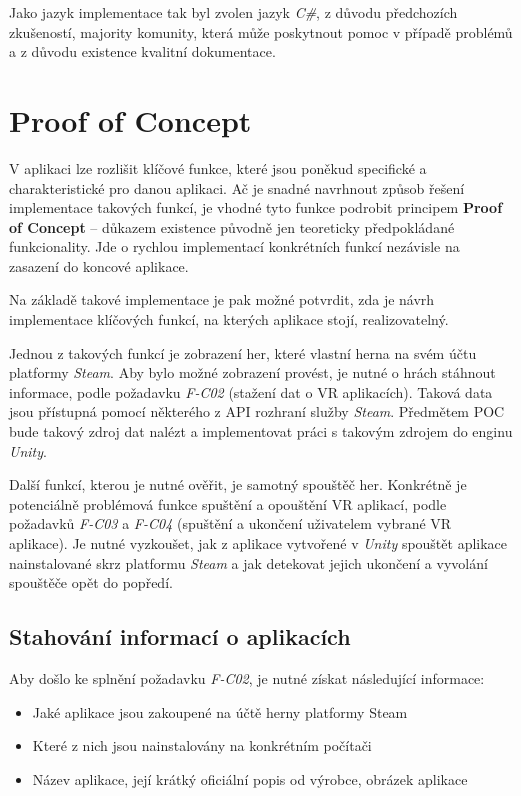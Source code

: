Jako jazyk implementace tak byl zvolen jazyk \emph{C\#}, z důvodu
předchozích zkušeností, majority komunity, která může poskytnout pomoc v
případě problémů a z důvodu existence kvalitní dokumentace.

\section{Proof of Concept}\label{proof-of-concept}

V aplikaci lze rozlišit klíčové funkce, které jsou poněkud specifické a
charakteristické pro danou aplikaci. Ač je snadné navrhnout způsob
řešení implementace takových funkcí, je vhodné tyto funkce podrobit
principem \textbf{Proof of Concept} -- důkazem existence původně jen
teoreticky předpokládané funkcionality. Jde o rychlou implementací
konkrétních funkcí nezávisle na zasazení do koncové aplikace.

Na základě takové implementace je pak možné potvrdit, zda je návrh
implementace klíčových funkcí, na kterých aplikace stojí,
realizovatelný.

Jednou z takových funkcí je zobrazení her, které vlastní herna na svém
účtu platformy \emph{Steam}. Aby bylo možné zobrazení provést, je nutné
o hrách stáhnout informace, podle požadavku \emph{F-C02} (stažení dat o
VR aplikacích). Taková data jsou přístupná pomocí některého z API
rozhraní služby \emph{Steam}. Předmětem POC bude takový zdroj dat nalézt
a implementovat práci s takovým zdrojem do enginu \emph{Unity}.

Další funkcí, kterou je nutné ověřit, je samotný spouštěč her. Konkrétně
je potenciálně problémová funkce spuštění a opouštění VR aplikací, podle
požadavků \emph{F-C03} a \emph{F-C04} (spuštění a ukončení uživatelem
vybrané VR aplikace). Je nutné vyzkoušet, jak z aplikace vytvořené v
\emph{Unity} spouštět aplikace nainstalované skrz platformu \emph{Steam}
a jak detekovat jejich ukončení a vyvolání spouštěče opět do popředí.

\subsection{Stahování informací o
aplikacích}\label{stahovuxe1nuxed-informacuxed-o-aplikacuxedch}

Aby došlo ke splnění požadavku \emph{F-C02}, je nutné získat následující
informace:

\begin{itemize}
\tightlist
\item
  Jaké aplikace jsou zakoupené na účtě herny platformy Steam
\item
  Které z nich jsou nainstalovány na konkrétním počítači
\item
  Název aplikace, její krátký oficiální popis od výrobce, obrázek
  aplikace
\end{itemize}


